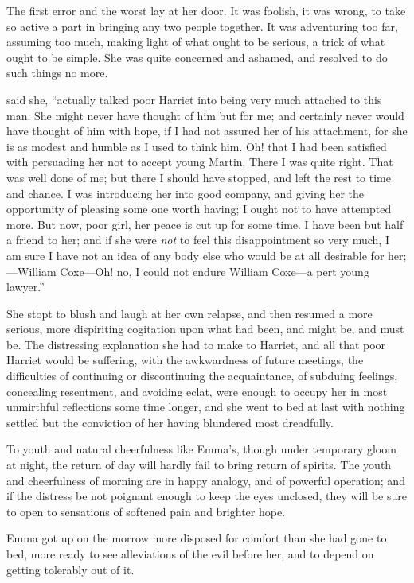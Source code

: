 The first error and the worst lay at her door. It was foolish, it was wrong, to take so active a part in bringing any two people together. It was adventuring too far, assuming too much, making light of what ought to be serious, a trick of what ought to be simple. She was quite concerned and ashamed, and resolved to do such things no more.

 said she, “actually talked poor Harriet into being very much attached to this man. She might never have thought of him but for me; and certainly never would have thought of him with hope, if I had not assured her of his attachment, for she is as modest and humble as I used to think him. Oh! that I had been satisfied with persuading her not to accept young Martin. There I was quite right. That was well done of me; but there I should have stopped, and left the rest to time and chance. I was introducing her into good company, and giving her the opportunity of pleasing some one worth having; I ought not to have attempted more. But now, poor girl, her peace is cut up for some time. I have been but half a friend to her; and if she were {\em not} to feel this disappointment so very much, I am sure I have not an idea of any body else who would be at all desirable for her;---William Coxe---Oh! no, I could not endure William Coxe---a pert young lawyer.”

She stopt to blush and laugh at her own relapse, and then resumed a more serious, more dispiriting cogitation upon what had been, and might be, and must be. The distressing explanation she had to make to Harriet, and all that poor Harriet would be suffering, with the awkwardness of future meetings, the difficulties of continuing or discontinuing the acquaintance, of subduing feelings, concealing resentment, and avoiding eclat, were enough to occupy her in most unmirthful reflections some time longer, and she went to bed at last with nothing settled but the conviction of her having blundered most dreadfully.

To youth and natural cheerfulness like Emma's, though under temporary gloom at night, the return of day will hardly fail to bring return of spirits. The youth and cheerfulness of morning are in happy analogy, and of powerful operation; and if the distress be not poignant enough to keep the eyes unclosed, they will be sure to open to sensations of softened pain and brighter hope.

Emma got up on the morrow more disposed for comfort than she had gone to bed, more ready to see alleviations of the evil before her, and to depend on getting tolerably out of it.

